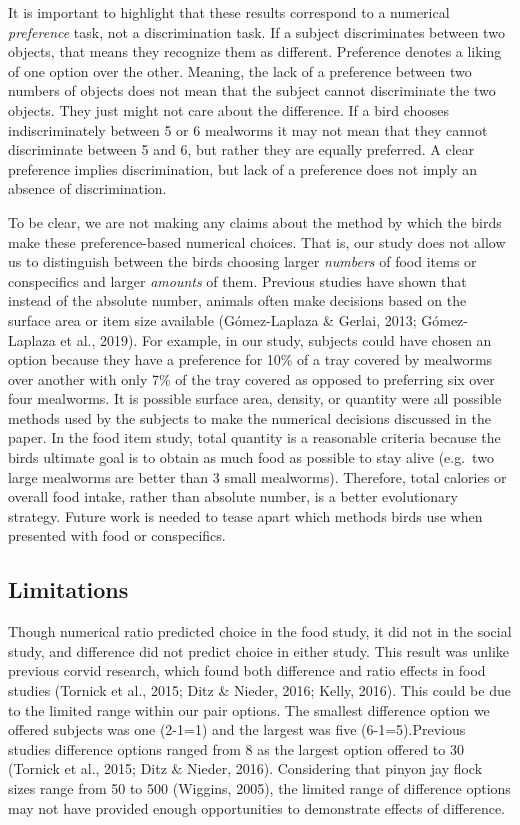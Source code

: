 \documentclass[
  ,doc,floatsintext]{apa6}
\begin{document}
It is important to highlight that these results correspond to a numerical \emph{preference} task, not a discrimination task. If a subject discriminates between two objects, that means they recognize them as different. Preference denotes a liking of one option over the other. Meaning, the lack of a preference between two numbers of objects does not mean that the subject cannot discriminate the two objects. They just might not care about the difference. If a bird chooses indiscriminately between 5 or 6 mealworms it may not mean that they cannot discriminate between 5 and 6, but rather they are equally preferred. A clear preference implies discrimination, but lack of a preference does not imply an absence of discrimination.

To be clear, we are not making any claims about the method by which the birds make these preference-based numerical choices. That is, our study does not allow us to distinguish between the birds choosing larger \emph{numbers} of food items or conspecifics and larger \emph{amounts} of them. Previous studies have shown that instead of the absolute number, animals often make decisions based on the surface area or item size available (Gómez-Laplaza \& Gerlai, 2013; Gómez-Laplaza et al., 2019). For example, in our study, subjects could have chosen an option because they have a preference for 10\% of a tray covered by mealworms over another with only 7\% of the tray covered as opposed to preferring six over four mealworms. It is possible surface area, density, or quantity were all possible methods used by the subjects to make the numerical decisions discussed in the paper. In the food item study, total quantity is a reasonable criteria because the birds ultimate goal is to obtain as much food as possible to stay alive (e.g.~two large mealworms are better than 3 small mealworms). Therefore, total calories or overall food intake, rather than absolute number, is a better evolutionary strategy. Future work is needed to tease apart which methods birds use when presented with food or conspecifics.

\hypertarget{limitations}{%
\subsection{Limitations}\label{limitations}}

Though numerical ratio predicted choice in the food study, it did not in the social study, and difference did not predict choice in either study. This result was unlike previous corvid research, which found both difference and ratio effects in food studies (Tornick et al., 2015; Ditz \& Nieder, 2016; Kelly, 2016). This could be due to the limited range within our pair options. The smallest difference option we offered subjects was one (2-1=1) and the largest was five (6-1=5).Previous studies difference options ranged from 8 as the largest option offered to 30 (Tornick et al., 2015; Ditz \& Nieder, 2016). Considering that pinyon jay flock sizes range from 50 to 500 (Wiggins, 2005), the limited range of difference options may not have provided enough opportunities to demonstrate effects of difference.
\end{document}
